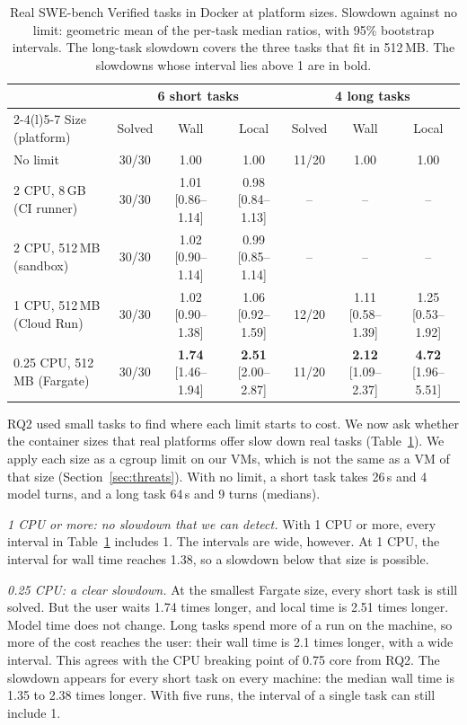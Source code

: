 \documentclass[sigconf,review,anonymous]{acmart}
\newcommand{\best}[1]{\textbf{\textcolor{findgreen}{#1}}}   %
\begin{document}
\begin{table}[t]
\caption{Real SWE-bench Verified tasks in Docker at platform sizes.
Slowdown against no limit: geometric mean of the per-task median ratios,
with 95\% bootstrap intervals. The long-task slowdown covers the three
tasks that fit in 512\,MB. The slowdowns whose interval lies above 1 are in bold.}
\label{tab:real}
\small
\begin{tabular}{@{}l ccc ccc@{}}
\toprule
& \multicolumn{3}{c}{6 short tasks} & \multicolumn{3}{c}{4 long tasks} \\
\cmidrule(lr){2-4}\cmidrule(l){5-7}
Size (platform) & Solved & Wall & Local & Solved & Wall & Local \\
\midrule
No limit & 30/30 & 1.00 & 1.00 & 11/20 & 1.00 & 1.00 \\
2 CPU, 8\,GB (CI runner) & 30/30 & 1.01 [0.86--1.14] & 0.98 [0.84--1.13] & -- & -- & -- \\
2 CPU, 512\,MB (sandbox) & 30/30 & 1.02 [0.90--1.14] & 0.99 [0.85--1.14] & -- & -- & -- \\
1 CPU, 512\,MB (Cloud Run) & 30/30 & 1.02 [0.90--1.38] & 1.06 [0.92--1.59] & 12/20 & 1.11 [0.58--1.39] & 1.25 [0.53--1.92] \\
0.25 CPU, 512\,MB (Fargate) & 30/30 & \best{1.74} [1.46--1.94] & \best{2.51} [2.00--2.87] & 11/20 & \best{2.12} [1.09--2.37] & \best{4.72} [1.96--5.51] \\
\bottomrule
\end{tabular}
\end{table}

RQ2 used small tasks to find where each limit starts to cost. We now ask
whether the container sizes that real platforms offer slow down real
tasks (Table~\ref{tab:real}). We apply each size as a cgroup limit on
our VMs, which is not the same as a VM of that size (Section~\ref{sec:threats}). With no limit, a short task takes 26\,s and 4 model turns,
and a long task 64\,s and 9 turns (medians).

\emph{1 CPU or more: no slowdown that we can detect.} With 1 CPU or
more, every interval in Table~\ref{tab:real} includes 1. The intervals
are wide, however. At 1 CPU, the interval for wall time reaches 1.38, so
a slowdown below that size is possible.

\emph{0.25 CPU: a clear slowdown.} At the smallest Fargate size, every
short task is still solved. But the user waits 1.74 times longer, and
local time is 2.51 times longer. Model time does not change. Long tasks
spend more of a run on the machine, so more of the cost reaches the
user: their wall time is 2.1 times longer, with a wide interval. This
agrees with the CPU breaking point of 0.75 core from RQ2. The slowdown
appears for every short task on every machine: the median wall time is
1.35 to 2.38 times longer. With five runs, the interval of a single
task can still include 1.
\end{document}
